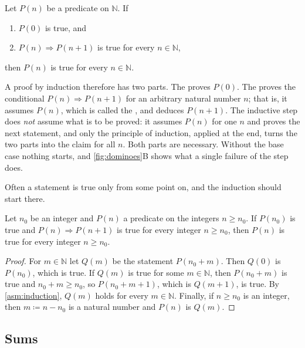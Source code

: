 \begin{assumption}
\label{asm:induction}
Let $P(n)$ be a predicate on $\mathbb N$. If
\begin{enumerate}
\item $P(0)$ is true, and
\item $P(n)\Rightarrow P(n+1)$ is true for every $n\in\mathbb N$,
\end{enumerate}
then $P(n)$ is true for every $n\in\mathbb N$.
\end{assumption}

A proof by induction therefore has two parts. The  proves $P(0)$. The  proves the conditional $P(n)\Rightarrow P(n+1)$ for an arbitrary natural number $n$; that is, it assumes $P(n)$, which is called the , and deduces $P(n+1)$. The inductive step does \emph{not} assume what is to be proved: it assumes $P(n)$ for one $n$ and proves the next statement, and only the principle of induction, applied at the end, turns the two parts into the claim for all $n$. Both parts are necessary. Without the base case nothing starts, and \cref{fig:dominoes}B shows what a single failure of the step does.

Often a statement is true only from some point on, and the induction should start there.

\begin{corollary}
\label{cor:induction-n0}
Let $n_0$ be an integer and $P(n)$ a predicate on the integers $n\ge n_0$. If $P(n_0)$ is true and $P(n)\Rightarrow P(n+1)$ is true for every integer $n\ge n_0$, then $P(n)$ is true for every integer $n\ge n_0$.
\end{corollary}

\begin{proof}
For $m\in\mathbb N$ let $Q(m)$ be the statement $P(n_0+m)$. Then $Q(0)$ is $P(n_0)$, which is true. If $Q(m)$ is true for some $m\in\mathbb N$, then $P(n_0+m)$ is true and $n_0+m\ge n_0$, so $P(n_0+m+1)$, which is $Q(m+1)$, is true. By \cref{asm:induction}, $Q(m)$ holds for every $m\in\mathbb N$. Finally, if $n\ge n_0$ is an integer, then $m\coloneqq n-n_0$ is a natural number and $P(n)$ is $Q(m)$.
\end{proof}

\subsection{Sums}


